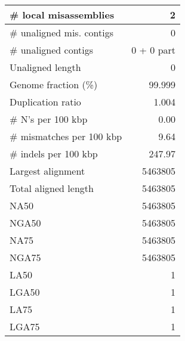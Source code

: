 \documentclass[12pt,a4paper]{article}
\begin{document}
\begin{table}[ht]
\begin{center}
\begin{tabular}{|l*{1}{|r}|}
\# local misassemblies & 2 \\ \hline
\# unaligned mis. contigs & 0 \\ \hline
\# unaligned contigs & 0 + 0 part \\ \hline
Unaligned length & 0 \\ \hline
Genome fraction (\%) & 99.999 \\ \hline
Duplication ratio & 1.004 \\ \hline
\# N's per 100 kbp & 0.00 \\ \hline
\# mismatches per 100 kbp & 9.64 \\ \hline
\# indels per 100 kbp & 247.97 \\ \hline
Largest alignment & 5463805 \\ \hline
Total aligned length & 5463805 \\ \hline
NA50 & 5463805 \\ \hline
NGA50 & 5463805 \\ \hline
NA75 & 5463805 \\ \hline
NGA75 & 5463805 \\ \hline
LA50 & 1 \\ \hline
LGA50 & 1 \\ \hline
LA75 & 1 \\ \hline
LGA75 & 1 \\ \hline
\end{tabular}
\end{center}
\end{table}
\end{document}
